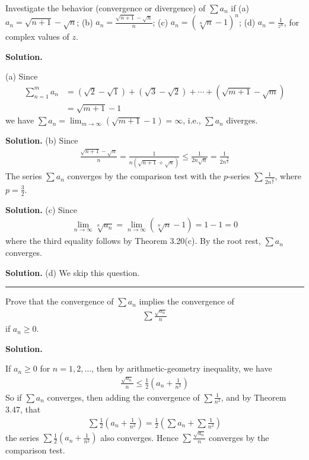 \documentclass[12pt]{article}
\theoremstyle{definition}
\begin{document}
Investigate the behavior (convergence or divergence) of $\sum a_n$ if
(a) $a_n=\sqrt{n+1}-\sqrt{n}$;
(b) $a_n=\frac{\sqrt{n+1}-\sqrt{n}}{n}$;
(c) $a_n=\left(\sqrt[n]{n}-1\right)^n$;
(d) $a_n=\frac{1}{z^n}$, for complex values of $z$.

\smallskip
\noindent\textbf{Solution.}\quad

(a) Since 
\begin{align*}
\sum_{n=1}^ma_n
&=\left(\sqrt{2}-\sqrt{1}\right)+\left(\sqrt{3}-\sqrt{2}\right)+\cdots+\left(\sqrt{m+1}-\sqrt{m}\right) \\
&=\sqrt{m+1}-1
\end{align*}
we have $\sum a_n=\lim_{m\to\infty}\left(\sqrt{m+1}-1\right)=\infty$, i.e., $\sum a_n$ diverges.

\smallskip
\noindent\textbf{Solution.}\quad
(b) Since
\begin{align*}
\frac{\sqrt{n+1}-\sqrt{n}}{n}
=\frac{1}{n\left(\sqrt{n+1}+\sqrt{n}\right)}
\le \frac{1}{2n\sqrt{n}}
=\frac{1}{2n^{\frac{3}{2}}}
\end{align*}
The series $\sum a_n$ converges by the comparison test with the $p$-series $\sum\frac{1}{2n^{\frac{3}{2}}}$, where $p=\frac{3}{2}$.

\smallskip
\noindent\textbf{Solution.}\quad
(c) Since
\begin{align*}
\lim_{n\to\infty}\sqrt[n]{a_n}
=\lim_{n\to\infty}\left(\sqrt[n]{n}-1\right)
=1-1
=0
\end{align*}
where the third equality follows by Theorem 3.20(c). By the root rest, $\sum a_n$ converges.

\smallskip
\noindent\textbf{Solution.}\quad
(d) We skip this question.



\bigskip\noindent\hrule\bigskip

Prove that the convergence of $\sum a_n$ implies the convergence of
\begin{align*}
\sum \frac{\sqrt{a_n}}{n}
\end{align*}
if $a_n\ge 0$.

\smallskip
\noindent\textbf{Solution.}\quad

If $a_n\ge 0$ for $n=1,2,\ldots$, then by arithmetic-geometry inequality, we have
\begin{align*}
\frac{\sqrt{a_n}}{n}
\le\frac{1}{2}\left(a_n+\frac{1}{n^2}\right)
\end{align*}
So if $\sum a_n$ converges, then adding the convergence of $\sum\frac{1}{n^2}$, and by Theorem 3.47, that
\begin{align*}
\sum\frac{1}{2}\left(a_n+\frac{1}{n^2}\right)
=\frac{1}{2}\left(\sum a_n+\sum\frac{1}{n^2}\right)
\end{align*}
the series $\sum\frac{1}{2}\left(a_n+\frac{1}{n^2}\right)$ also converges. Hence $\sum\frac{\sqrt{a_n}}{n}$ converges by the comparison test.
\end{document}
